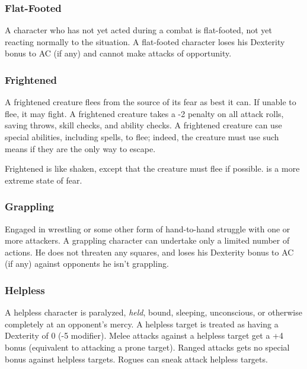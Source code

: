 \subsubsection{Flat-Footed}

A character who has not yet acted during a combat is flat-footed, 
not yet reacting normally to the situation. A flat-footed character loses his Dexterity 
bonus to AC (if any) and cannot make attacks of opportunity. 

\subsubsection{Frightened}

A frightened creature flees from the source of its fear as 
best it can. If unable to flee, it may fight. A frightened creature takes a -2 
penalty on all attack rolls, saving throws, skill checks, and ability checks. A 
frightened creature can use special abilities, including spells, to flee; indeed, 
the creature must use such means if they are the only way to escape. 

Frightened is like shaken, except that the creature must flee if possible.
 is a more extreme state of fear.

\subsubsection{Grappling}

Engaged in wrestling or some other form of hand-to-hand struggle 
with one or more attackers. A grappling character can undertake only a limited 
number of actions. He does not threaten any squares, and loses his Dexterity bonus 
to AC (if any) against opponents he isn't grappling.

\subsubsection{Helpless}

A helpless character is paralyzed, \textit{held}, bound, sleeping, 
unconscious, or otherwise completely at an opponent's mercy. A helpless target 
is treated as having a Dexterity of 0 (-5 modifier). Melee attacks against a helpless 
target get a +4 bonus (equivalent to attacking a prone target). Ranged attacks 
gets no special bonus against helpless targets. Rogues can sneak attack helpless 
targets. 


